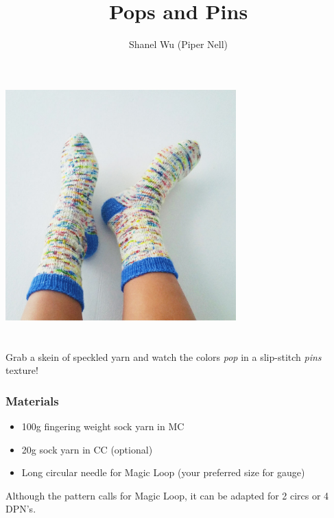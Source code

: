 \documentclass[12pt]{article}
\title{Pops and Pins}
\author{Shanel Wu (Piper Nell)}
\begin{document}
\begin{titlingpage}

\begin{multicols}{2}
\includegraphics[height=3.5in]{feetWall.jpg}

\vfill

\section*{\thetitle}
\vspace{-0.5em}
\subsubsection*{\theauthor}

Grab a skein of speckled yarn and watch the colors \emph{pop} in a slip-stitch \emph{pins} texture!

\vspace{-1em}
\subsubsection*{Materials}

\begin{itemize}
\item 100g fingering weight sock yarn in MC
\item 20g sock yarn in CC (optional)
\item Long circular needle for Magic Loop (your preferred size for gauge)
\end{itemize}

Although the pattern calls for Magic Loop, it can be adapted for 2 circs or 4 DPN's.

\vspace{-1em}

\end{multicols}
\end{titlingpage}
\end{document}
